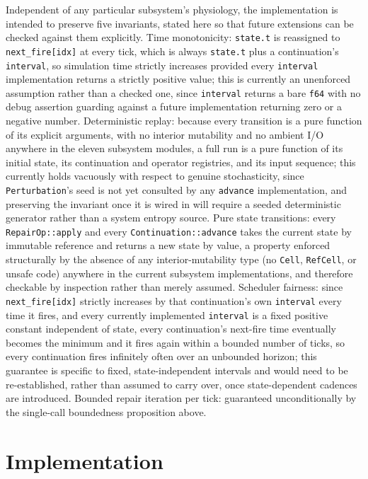\documentclass[11pt]{article}
\begin{document}
Independent of any particular subsystem's physiology, the implementation is intended to preserve five invariants, stated here so that future extensions can be checked against them explicitly. Time monotonicity: \texttt{state.t} is reassigned to \texttt{next\_fire[idx]} at every tick, which is always \texttt{state.t} plus a continuation's \texttt{interval}, so simulation time strictly increases provided every \texttt{interval} implementation returns a strictly positive value; this is currently an unenforced assumption rather than a checked one, since \texttt{interval} returns a bare \texttt{f64} with no debug assertion guarding against a future implementation returning zero or a negative number. Deterministic replay: because every transition is a pure function of its explicit arguments, with no interior mutability and no ambient I/O anywhere in the eleven subsystem modules, a full run is a pure function of its initial state, its continuation and operator registries, and its input sequence; this currently holds vacuously with respect to genuine stochasticity, since \texttt{Perturbation}'s seed is not yet consulted by any \texttt{advance} implementation, and preserving the invariant once it is wired in will require a seeded deterministic generator rather than a system entropy source. Pure state transitions: every \texttt{RepairOp::apply} and every \texttt{Continuation::advance} takes the current state by immutable reference and returns a new state by value, a property enforced structurally by the absence of any interior-mutability type (no \texttt{Cell}, \texttt{RefCell}, or unsafe code) anywhere in the current subsystem implementations, and therefore checkable by inspection rather than merely assumed. Scheduler fairness: since \texttt{next\_fire[idx]} strictly increases by that continuation's own \texttt{interval} every time it fires, and every currently implemented \texttt{interval} is a fixed positive constant independent of state, every continuation's next-fire time eventually becomes the minimum and it fires again within a bounded number of ticks, so every continuation fires infinitely often over an unbounded horizon; this guarantee is specific to fixed, state-independent intervals and would need to be re-established, rather than assumed to carry over, once state-dependent cadences are introduced. Bounded repair iteration per tick: guaranteed unconditionally by the single-call boundedness proposition above.

\section{Implementation}
\label{sec:implementation}
\end{document}
